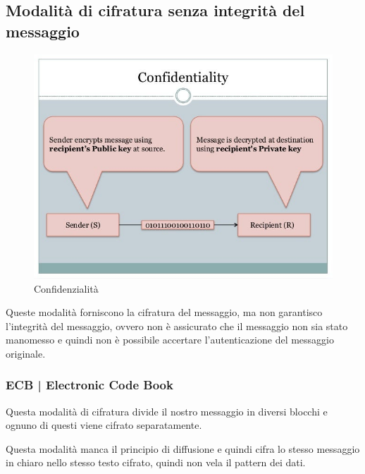 \subsection{Modalità di cifratura senza integrità del messaggio}

\begin{figure}[H]
	\centering
	\includegraphics[width=.9\textwidth, height=.9\textheight, keepaspectratio]{./images/aes_modes/confidentiality.png}
	\caption{Confidenzialità}
	\label{fig:confidentiality}
\end{figure}

\textsf{\small Queste modalità forniscono la cifratura del messaggio, ma non garantisco l'integrità del messaggio, ovvero non è assicurato che il messaggio non sia stato manomesso e quindi non è possibile accertare l'autenticazione del messaggio originale.} %

\subsubsection{ECB | Electronic Code Book}




\textsf{\small Questa modalità di cifratura divide il nostro messaggio in diversi blocchi e ognuno di questi viene cifrato separatamente.}

\textsf{\small Questa modalità manca il principio di diffusione e quindi cifra lo stesso messaggio in chiaro nello stesso testo cifrato, quindi non vela il pattern dei dati.} %

